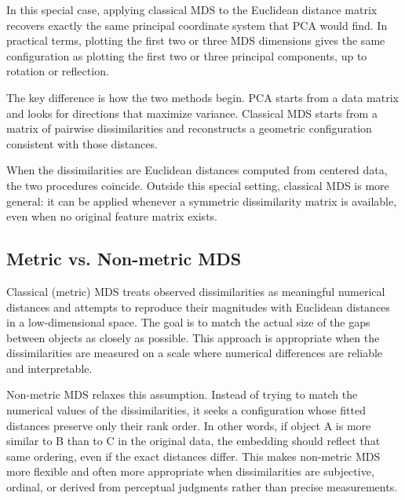 In this special case, applying classical MDS to the Euclidean distance
matrix recovers exactly the same principal coordinate system that PCA
would find. In practical terms, plotting the first two or three MDS
dimensions gives the same configuration as plotting the first two or
three principal components, up to rotation or reflection.

\medskip

The key difference is how the two methods begin. PCA starts from a data
matrix and looks for directions that maximize variance. Classical MDS
starts from a matrix of pairwise dissimilarities and reconstructs a
geometric configuration consistent with those distances.

When the dissimilarities are Euclidean distances computed from centered
data, the two procedures coincide. Outside this special setting, classical
MDS is more general: it can be applied whenever a symmetric dissimilarity
matrix is available, even when no original feature matrix exists.

\bigskip

\subsection{Metric vs. Non-metric MDS}

\medskip

Classical (metric) MDS treats observed dissimilarities as meaningful
numerical distances and attempts to reproduce their magnitudes with
Euclidean distances in a low-dimensional space. The goal is to match
the actual size of the gaps between objects as closely as possible.
This approach is appropriate when the dissimilarities are measured on
a scale where numerical differences are reliable and interpretable.

\medskip

Non-metric MDS relaxes this assumption. Instead of trying to match
the numerical values of the dissimilarities, it seeks a configuration
whose fitted distances preserve only their rank order. In other words,
if object A is more similar to B than to C in the original data,
the embedding should reflect that same ordering, even if the exact
distances differ. This makes non-metric MDS more flexible and often
more appropriate when dissimilarities are subjective, ordinal, or
derived from perceptual judgments rather than precise measurements.

\medskip

